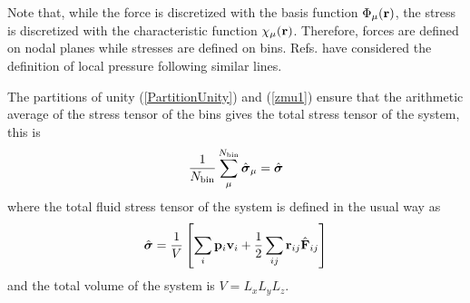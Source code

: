 \documentclass[b5paper,openright,11pt]{book}
\begin{document}
Note  that, while  the force  is discretized  with the  basis function
$\Phi_\mu({\bf r})$, the stress is discretized with the characteristic
function $\chi_\mu({\bf  r})$. Therefore, forces are  defined on nodal
planes    while    stresses    are    defined    on    bins.     Refs.
\cite{Schindler2010,Lion2012} have  considered the definition  of local
pressure following similar lines.


The partitions  of unity (\ref{PartitionUnity}) and  (\ref{zmu1}) ensure
that the arithmetic average of the stress tensor of the bins gives the
total stress tensor of the system, this is
\begin{align}
\frac{1}{N_{\rm bin}}\sum_{\mu}^{N_{\rm bin}}\hat{\boldsymbol{\sigma}}_{\mu}=\hat{\boldsymbol{\sigma}}
\end{align}
where the total fluid stress tensor of the system is defined in the usual way as
\begin{align}
  \hat{\boldsymbol{\sigma}}=\frac{1}{V}\left[\sum_{i}{\bf p}_i{\bf v}_i
+\frac{1}{2}\sum_{ij}{\bf r}_{ij}\hat{\bf F}_{ij}\right]
\end{align}
and the total volume of the system is $V=L_xL_yL_z$.
\end{document}
